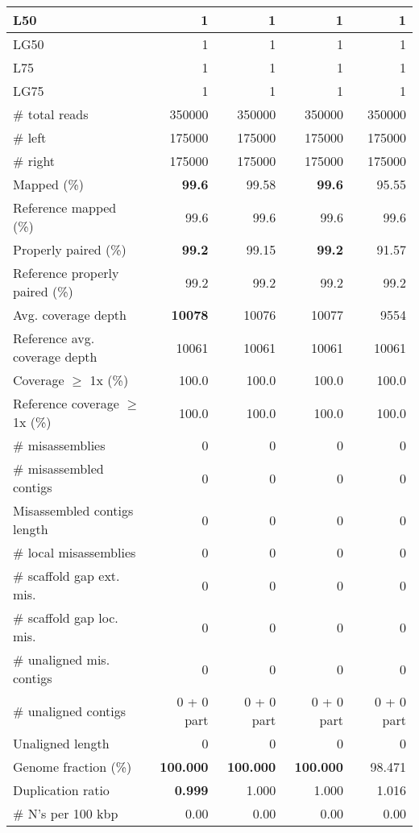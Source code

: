 \documentclass[12pt,a4paper]{article}
\begin{document}
\begin{table}[ht]
\begin{center}
\begin{tabular}{|l*{4}{|r}|}
L50 & 1 & 1 & 1 & 1 \\ \hline
LG50 & 1 & 1 & 1 & 1 \\ \hline
L75 & 1 & 1 & 1 & 1 \\ \hline
LG75 & 1 & 1 & 1 & 1 \\ \hline
\# total reads & 350000 & 350000 & 350000 & 350000 \\ \hline
\# left & 175000 & 175000 & 175000 & 175000 \\ \hline
\# right & 175000 & 175000 & 175000 & 175000 \\ \hline
Mapped (\%) & {\bf 99.6} & 99.58 & {\bf 99.6} & 95.55 \\ \hline
Reference mapped (\%) & 99.6 & 99.6 & 99.6 & 99.6 \\ \hline
Properly paired (\%) & {\bf 99.2} & 99.15 & {\bf 99.2} & 91.57 \\ \hline
Reference properly paired (\%) & 99.2 & 99.2 & 99.2 & 99.2 \\ \hline
Avg. coverage depth & {\bf 10078} & 10076 & 10077 & 9554 \\ \hline
Reference avg. coverage depth & 10061 & 10061 & 10061 & 10061 \\ \hline
Coverage $\geq$ 1x (\%) & 100.0 & 100.0 & 100.0 & 100.0 \\ \hline
Reference coverage $\geq$ 1x (\%) & 100.0 & 100.0 & 100.0 & 100.0 \\ \hline
\# misassemblies & 0 & 0 & 0 & 0 \\ \hline
\# misassembled contigs & 0 & 0 & 0 & 0 \\ \hline
Misassembled contigs length & 0 & 0 & 0 & 0 \\ \hline
\# local misassemblies & 0 & 0 & 0 & 0 \\ \hline
\# scaffold gap ext. mis. & 0 & 0 & 0 & 0 \\ \hline
\# scaffold gap loc. mis. & 0 & 0 & 0 & 0 \\ \hline
\# unaligned mis. contigs & 0 & 0 & 0 & 0 \\ \hline
\# unaligned contigs & 0 + 0 part & 0 + 0 part & 0 + 0 part & 0 + 0 part \\ \hline
Unaligned length & 0 & 0 & 0 & 0 \\ \hline
Genome fraction (\%) & {\bf 100.000} & {\bf 100.000} & {\bf 100.000} & 98.471 \\ \hline
Duplication ratio & {\bf 0.999} & 1.000 & 1.000 & 1.016 \\ \hline
\# N's per 100 kbp & 0.00 & 0.00 & 0.00 & 0.00 \\ \hline

\end{tabular}
\end{center}
\end{table}
\end{document}
